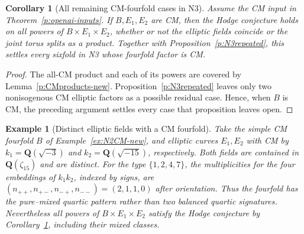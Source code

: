\documentclass[10pt,reqno]{article}
\theoremstyle{emphasizedplain}
\newtheorem{corollary}[theorem]{Corollary}
\theoremstyle{emphasizeddefinition}
\newtheorem{example}[theorem]{Example}
\theoremstyle{emphasizeddefinition}
\newcommand{\Q}{\mathbf Q}
\begin{document}
\begin{corollary}[All remaining CM-fourfold cases in N3]\label{p:N3CM-new}
Assume the CM input in Theorem~\ref{p:openai-inputs}.
If $B,E_1,E_2$ are CM, then the Hodge conjecture holds on all
powers of $B\times E_1\times E_2$, whether or not the elliptic
fields coincide or the joint torus splits as a product.
Together with Proposition~\ref{p:N3repeated}, this settles every
sixfold in N3 whose fourfold factor is CM.
\end{corollary}
\begin{proof}
The all-CM product and each of its powers are covered by
Lemma~\ref{p:CMproducts-new}. Proposition~\ref{p:N3repeated}
leaves only two nonisogenous CM elliptic factors as a possible
residual case. Hence, when $B$ is CM, the preceding argument
settles every case that proposition leaves open.
\end{proof}
\begin{example}[Distinct elliptic fields with a CM fourfold]
Take the simple CM fourfold $B$ of Example~\ref{ex:N2CM-new},
and elliptic curves $E_1,E_2$ with CM by
$k_1=\Q(\sqrt{-3})$ and $k_2=\Q(\sqrt{-15})$, respectively.
Both fields are contained in $\Q(\zeta_{15})$ and are distinct.
For the type $\{1,2,4,7\}$, the multiplicities for the four
embeddings of $k_1k_2$, indexed by signs, are
$(n_{++},n_{+-},n_{-+},n_{--})=(2,1,1,0)$ after orientation.
Thus the fourfold has the pure--mixed quartic pattern rather than
two balanced quartic signatures. Nevertheless all powers of
$B\times E_1\times E_2$ satisfy the Hodge conjecture by
Corollary~\ref{p:N3CM-new}, including their mixed classes.
\end{example}
\end{document}
